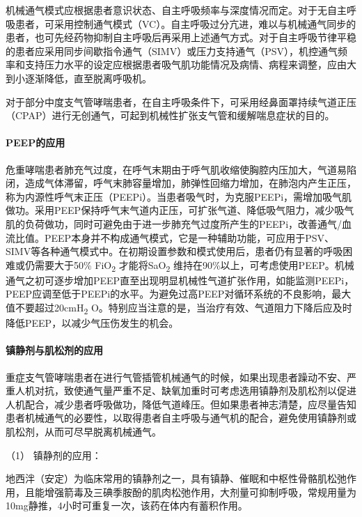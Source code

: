 机械通气模式应根据患者意识状态、自主呼吸频率与深度情况而定。对于无自主呼吸患者，可采用控制通气模式（VC）。自主呼吸过分亢进，难以与机械通气同步的患者，也可先经药物抑制自主呼吸后再采用上述通气方式。对于自主呼吸节律平稳的患者应采用同步间歇指令通气（SIMV）或压力支持通气（PSV），机控通气频率和支持压力水平的设定应根据患者吸气肌功能情况及病情、病程来调整，应由大到小逐渐降低，直至脱离呼吸机。

对于部分中度支气管哮喘患者，在自主呼吸条件下，可采用经鼻面罩持续气道正压（CPAP）进行无创通气，可起到机械性扩张支气管和缓解喘息症状的目的。

\paragraph{PEEP的应用}

危重哮喘患者肺充气过度，在呼气末期由于呼气肌收缩使胸腔内压加大，气道易陷闭，造成气体滞留，呼气末肺容量增加，肺弹性回缩力增加，在肺泡内产生正压，称为内源性呼气末正压（PEEPi）。当患者吸气时，为克服PEEPi，需增加吸气肌做功。采用PEEP保持呼气末气道内正压，可扩张气道、降低吸气阻力，减少吸气肌的负荷做功，同时可避免由于进一步肺充气过度所产生的PEEPi，改善通气/血流比值。PEEP本身并不构成通气模式，它是一种辅助功能，可应用于PSV、SIMV等各种通气模式中。在初期设置参数和模式使用后，患者仍有显著的呼吸困难或仍需要大于50\%
FiO\textsubscript{2} 才能将SaO\textsubscript{2}
维持在90\%以上，可考虑使用PEEP。机械通气之初可逐步增加PEEP直至出现明显机械性气道扩张作用，如能监测PEEPi，PEEP应调至低于PEEPi的水平。为避免过高PEEP对循环系统的不良影响，最大值不要超过20cmH\textsubscript{2}
O。特别应当注意的是，当治疗有效、气道阻力下降后应及时降低PEEP，以减少气压伤发生的机会。

\paragraph{镇静剂与肌松剂的应用}

重症支气管哮喘患者在进行气管插管机械通气的时候，如果出现患者躁动不安、严重人机对抗，致使通气量严重不足、缺氧加重时可考虑选用镇静剂及肌松剂以促进人机配合，减少患者呼吸做功，降低气道峰压。但如果患者神志清楚，应尽量告知患者机械通气的必要性，以取得患者自主呼吸与通气机的配合，避免使用镇静剂或肌松剂，从而可尽早脱离机械通气。

\hypertarget{text00268.htmlux5cux23CHP9-3-3-3-6-1}{}
（1） 镇静剂的应用：

地西泮（安定）为临床常用的镇静剂之一，具有镇静、催眠和中枢性骨骼肌松弛作用，且能增强箭毒及三碘季胺酚的肌肉松弛作用，大剂量可抑制呼吸，常规用量为10mg静推，4小时可重复一次，该药在体内有蓄积作用。

